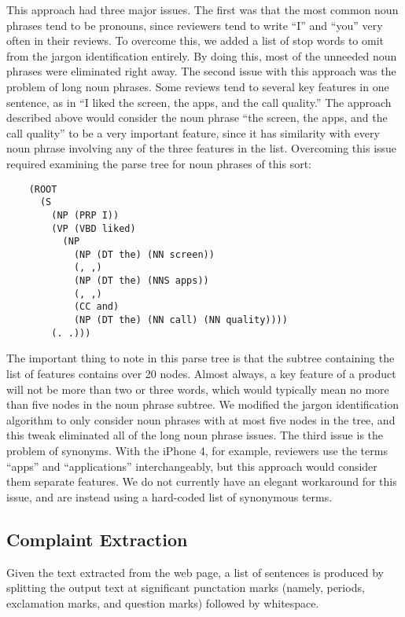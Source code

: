 \documentclass{article}
\begin{document}
This approach had three major issues.  The first was that the most common noun phrases tend to be pronouns, since reviewers tend to write ``I'' and ``you'' very often in their reviews.  To overcome this, we added a list of stop words to omit from the jargon identification entirely.  By doing this, most of the unneeded noun phrases were eliminated right away.  The second issue with this approach was the problem of long noun phrases.  Some reviews tend to several key features in one sentence, as in ``I liked the screen, the apps, and the call quality.''  The approach described above would consider the noun phrase ``the screen, the apps, and the call quality'' to be a very important feature, since it has similarity with every noun phrase involving any of the three features in the list.  Overcoming this issue required examining the parse tree for noun phrases of this sort: \begin{verbatim}
	(ROOT
	  (S
	    (NP (PRP I))
	    (VP (VBD liked)
	      (NP
	        (NP (DT the) (NN screen))
	        (, ,)
	        (NP (DT the) (NNS apps))
	        (, ,)
	        (CC and)
	        (NP (DT the) (NN call) (NN quality))))
	    (. .)))
\end{verbatim} The important thing to note in this parse tree is that the subtree containing the list of features contains over 20 nodes.  Almost always, a key feature of a product will not be more than two or three words, which would typically mean no more than five nodes in the noun phrase subtree.  We modified the jargon identification algorithm to only consider noun phrases with at most five nodes in the tree, and this tweak eliminated all of the long noun phrase issues.  The third issue is the problem of synonyms.  With the iPhone 4, for example, reviewers use the terms ``apps'' and ``applications'' interchangeably, but this approach would consider them separate features.  We do not currently have an elegant workaround for this issue, and are instead using a hard-coded list of synonymous terms.


\subsection{Complaint Extraction} %

Given the text extracted from the web page, a list of sentences is produced by
splitting the output text at significant punctation marks (namely, periods,
exclamation marks, and question marks) followed by whitespace.
\end{document}
